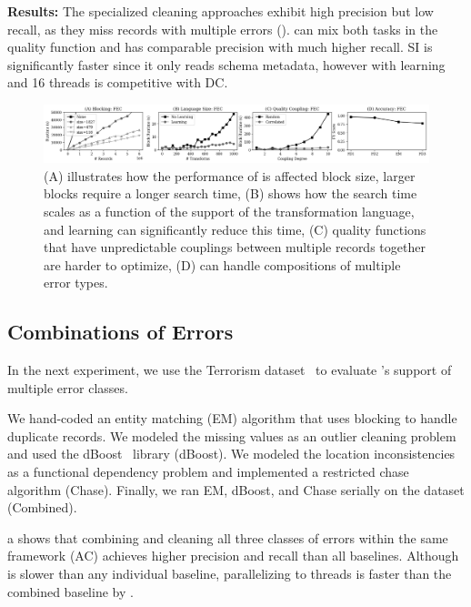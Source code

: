 \vspace{0.5em}\noindent\textbf{Results: } The specialized cleaning approaches exhibit high precision but low recall, as they miss records with multiple errors ().  \sys can mix both tasks in the quality function and has comparable precision with much higher recall.  SI is significantly faster since it only reads schema metadata, however \sys with learning and 16 threads is competitive with DC.  
\begin{figure}[ht]
\centering
 \includegraphics[width=\textwidth]{exp/exp4.png}
 \caption{(A) illustrates how the performance of \sys is affected block size, larger blocks require a longer search time, (B) shows how the search time scales as a function of the support of the transformation language, and learning can significantly reduce this time, (C) quality functions that have unpredictable couplings between multiple records together are harder to optimize, (D) \sys can handle compositions of multiple error types.
 \label{fig:microbenchmarks}}
\end{figure}

\subsection{Combinations of Errors}
In the next experiment, we use the Terrorism dataset~\cite{data-terrorism} to evaluate \sys's support of multiple error classes.  

 We hand-coded an entity matching (EM) algorithm that uses blocking to handle duplicate records.  We modeled the missing values as an outlier cleaning problem and used the dBoost~\cite{} library (dBoost). We modeled the location inconsistencies as a functional dependency problem and implemented a restricted chase algorithm (Chase).  Finally, we ran EM, dBoost, and Chase serially on the dataset (Combined).

 a shows that combining and cleaning all three classes of errors within the same \sys framework (AC) achieves higher precision and recall than all baselines.     Although \sys is slower than any individual baseline, parallelizing \sys to  threads is faster than the combined baseline by . 


